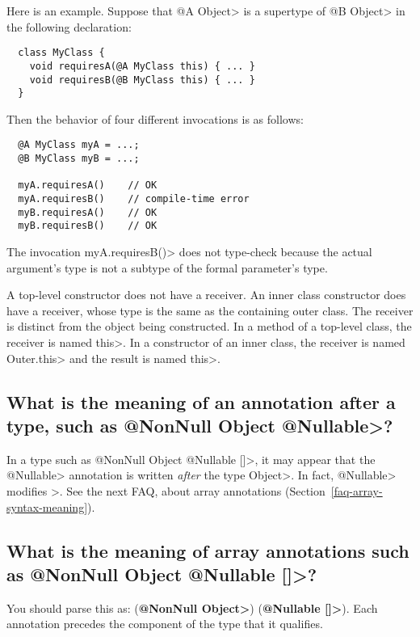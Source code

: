 Here is an example.  Suppose that \<@A Object> is a supertype of \<@B
Object> in the following declaration:

\begin{Verbatim}
  class MyClass {
    void requiresA(@A MyClass this) { ... }
    void requiresB(@B MyClass this) { ... }
  }
\end{Verbatim}

\noindent
Then the behavior of four different invocations is as follows:

\begin{Verbatim}
  @A MyClass myA = ...;
  @B MyClass myB = ...;

  myA.requiresA()    // OK
  myA.requiresB()    // compile-time error
  myB.requiresA()    // OK
  myB.requiresB()    // OK
\end{Verbatim}

The invocation \<myA.requiresB()> does not type-check because the actual
argument's type is not a subtype of the formal parameter's type.

A top-level constructor does not have a receiver.  An inner class
constructor does have a receiver, whose type is the same as the containing
outer class.  The receiver is distinct from the object being constructed.
In a method of a top-level class, the receiver is named \<this>.  In a
constructor of an inner class, the receiver is named \<Outer.this> and the
result is named \<this>.


\subsection{What is the meaning of an annotation after a type, such as \<@NonNull Object @Nullable>?\label{faq-annotation-after-type}}

In a type such as \<@NonNull Object @Nullable []>, it may appear that the
\<@Nullable> annotation is written \emph{after} the type \<Object>.  In
fact, \<@Nullable> modifies \<[]>.  See the next FAQ, about array
annotations (Section~\ref{faq-array-syntax-meaning}).


\subsection{What is the meaning of array annotations such as \<@NonNull Object @Nullable []>?\label{faq-array-syntax-meaning}}

You should parse this as:
(\textbf{\<@NonNull Object>}) (\textbf{\<@Nullable []>}).
Each annotation precedes the component of the type that it qualifies.

